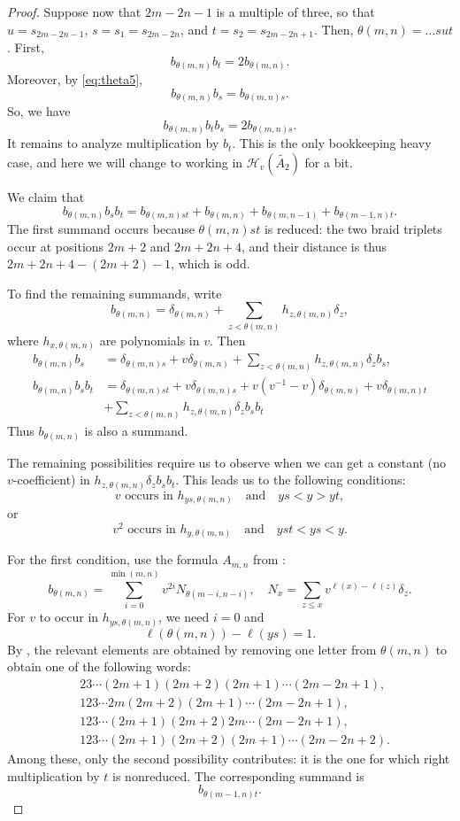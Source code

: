 \documentclass[a4paper,11pt]{amsart}
\let\emph\relax
\newcommand{\Hecke}{\mc H}
\newcommand{\mc}{\mathcal}
\numberwithin{equation}{subsection}
\theoremstyle{definition}
\theoremstyle{remark}
\begin{document}
\begin{proof}
\smallskip

\noindent\emph{Case 3.}
Suppose now that $2m-2n-1$ is a multiple of three, so that $u = s_{2m-2n-1}$, $s = s_1 = s_{2m-2n}$, and $t = s_2 = s_{2m-2n+1}$. Then, $\theta(m,n) = ...sut$. 
First,
\[
b_{\theta(m,n)}b_t=2b_{\theta(m,n)}.
\]
Moreover, by \autoref{eq:theta5},
\[
b_{\theta(m,n)}b_s= b_{\theta(m,n)s}.
\]
So, we have \[b_{\theta(m,n)}b_tb_s = 2b_{\theta(m,n)s}.\] 
It remains to analyze multiplication by \(b_t\). This is the only bookkeeping
heavy case, and here we will change to working in $\Hecke_v(\widetilde{A_2})$ for a bit.

We claim that
\[
b_{\theta(m,n)}b_sb_t
=
b_{\theta(m,n)st}
+
b_{\theta(m,n)}
+
b_{\theta(m,n-1)}
+
b_{\theta(m-1,n)t}.
\]
The first summand occurs because \(\theta(m,n)st\) is reduced: the two braid
triplets occur at positions \(2m+2\) and \(2m+2n+4\), and their distance is thus $2m + 2n + 4 - (2m + 2) - 1$, which is
odd.

To find the remaining summands, write
\[
b_{\theta(m,n)}
=
\delta_{\theta(m,n)}
+
\sum_{z<\theta(m,n)}h_{z,\theta(m,n)}\delta_z,
\]
where $h_{x,\theta(m,n)}$ are polynomials in $v$. Then
\[
\begin{aligned}
b_{\theta(m,n)}b_s
&=
\delta_{\theta(m,n)s}
+
v\delta_{\theta(m,n)}
+
\sum_{z<\theta(m,n)}h_{z,\theta(m,n)}\delta_z b_s,
\\
b_{\theta(m,n)}b_sb_t
&=
\delta_{\theta(m,n)st}
+ 
v\delta_{\theta(m,n)s} 
+
v(v^{-1}-v)\delta_{\theta(m,n)}
+
v\delta_{\theta(m,n)t}\\&+
\sum_{z<\theta(m,n)}h_{z,\theta(m,n)}\delta_z b_sb_t 
\end{aligned}
\]
Thus \(b_{\theta(m,n)}\) is also a summand.

The remaining possibilities require us to observe when we can get a constant (no $v$-coefficient) in $h_{z,\theta(m,n)}\delta_zb_sb_t$. This leads us to the following conditions:
\[
v \text{ occurs in } h_{ys,\theta(m,n)}
\quad\text{and}\quad
ys<y>yt,
\]
or
\[
v^2 \text{ occurs in } h_{y,\theta(m,n)}
\quad\text{and}\quad
yst<ys<y.
\]

For the first condition, use the formula \(A_{m,n}\) from \cite{LiPa}:
\[
b_{\theta(m,n)}
=
\sum_{i=0}^{\min(m,n)}v^{2i}N_{\theta(m-i,n-i)},
\quad
N_x=\sum_{z\leq x}v^{\ell(x)-\ell(z)}\delta_z.
\]
For \(v\) to occur in \(h_{ys,\theta(m,n)}\), we need \(i=0\) and
\[
\ell(\theta(m,n))-\ell(ys)=1.
\]
By \cite[Corollary~1.3]{LiPa}, the relevant elements are obtained by removing one letter from $\theta(m,n)$ to obtain one of the following words:
\[
\begin{aligned}
&23\cdots(2m+1)(2m+2)(2m+1)\cdots(2m-2n+1),\\
&123\cdots 2m(2m+2)(2m+1)\cdots(2m-2n+1),\\
&123\cdots(2m+1)(2m+2)2m\cdots(2m-2n+1),\\
&123\cdots(2m+1)(2m+2)(2m+1)\cdots(2m-2n+2).
\end{aligned}
\]
Among these, only the second possibility contributes: it is the one for which
right multiplication by \(t\) is nonreduced. The corresponding summand is
\[
b_{\theta(m-1,n)t}.
\]


\end{proof}
\end{document}
